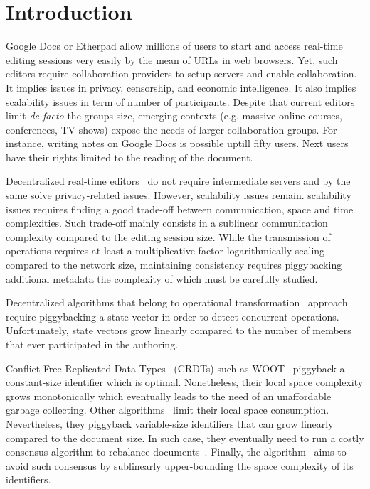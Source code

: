 
\section{Introduction}

Google Docs or Etherpad allow millions of users to start and access real-time
editing sessions very easily by the mean of URLs in web browsers. Yet, such
editors require collaboration providers to setup servers and enable
collaboration. It implies issues in privacy, censorship, and economic
intelligence. It also implies scalability issues in term of number of
participants. Despite that current editors limit \emph{de facto} the groups
size, emerging contexts (e.g. massive online courses, conferences, TV-shows)
expose the needs of larger collaboration groups.  For instance, writing notes on
Google Docs is possible uptill fifty users. Next users have their rights limited
to the reading of the document.

Decentralized real-time editors~\cite{oster2006data, sun1998operational,
  sun2009contextbased} do not require intermediate servers and by the same solve
privacy-related issues. However, scalability issues remain.  
scalability issues requires finding a good trade-off between communication,
space and time complexities. Such trade-off mainly consists in a sublinear
communication complexity compared to the editing session size. While the
transmission of operations requires at least a multiplicative factor
logarithmically scaling compared to the network size, maintaining consistency
requires piggybacking additional metadata the complexity of which must be
carefully studied.

Decentralized algorithms that belong to operational
transformation~\cite{sun2009contextbased} approach require piggybacking a state
vector in order to detect concurrent operations. Unfortunately, state vectors
grow linearly compared to the number of members that ever participated in the
authoring.

Conflict-Free Replicated Data Types~\cite{shapiro2011comprehensive} (CRDTs) such
as WOOT~\cite{oster2006data} piggyback a constant-size identifier which is
optimal. Nonetheless, their local space complexity grows monotonically which
eventually leads to the need of an unaffordable garbage collecting. Other
algorithms~\cite{preguica2009commutative, weiss2010logootundo} limit their local
space consumption. Nevertheless, they piggyback variable-size identifiers that
can grow linearly compared to the document size. In such case, they eventually
need to run a costly consensus algorithm to rebalance
documents~\cite{zawirski2011asynchronous}. Finally, the \LSEQ
algorithm~\cite{nedelec2013concurrency} aims to avoid such consensus by
sublinearly upper-bounding the space complexity of its identifiers. 

